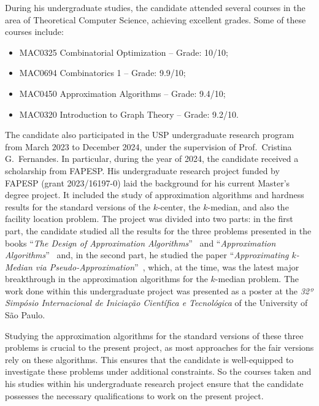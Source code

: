 \documentclass[12pt]{article}
\begin{document}
During his undergraduate studies, the candidate attended several courses in the area of Theoretical Computer Science, achieving excellent grades. Some of these courses include:
\begin{itemize} 
    \item MAC0325 Combinatorial Optimization – Grade: 10/10; 
    \item MAC0694 Combinatorics 1 – Grade: 9.9/10; 
    \item MAC0450 Approximation Algorithms – Grade: 9.4/10; 
    \item MAC0320 Introduction to Graph Theory – Grade: 9.2/10. 
\end{itemize}

The candidate also participated in the USP undergraduate research program from March 2023 to December 2024, under the supervision of Prof.\ Cristina G.\ Fernandes.  In particular, during the year of 2024, the candidate received a scholarship from FAPESP.
His undergraduate research project funded by FAPESP (grant 2023/16197-0) laid the background for his current Master's degree project. 
It included the study of approximation algorithms and hardness results for the standard versions of the $k$-center, 
the $k$-median, and also the facility location problem. 
The project was divided into two parts: in the first part, the candidate studied all the results for the three problems 
presented in the books  ``\emph{The Design of Approximation Algorithms}''~\cite{books/WS} and 
``\emph{Approximation Algorithms}''~\cite{books/Vazirani} and, in the second part, he studied the paper 
``\emph{Approximating $k$-Median via Pseudo-Approximation}''~\cite{LS2012}, which, at the time, 
was the latest major breakthrough in the approximation algorithms for the $k$-median problem. 
The work done within this undergraduate project was presented as a poster at the \emph{32º Simpósio Internacional de Iniciação Científica e Tecnológica} of the University of São Paulo.

Studying the approximation algorithms for the standard versions of these three problems is crucial to the present project, as most approaches for the fair versions rely on these algorithms. This ensures that the candidate is well-equipped to investigate these problems under additional constraints. So the courses taken and his studies within his undergraduate research project ensure that the candidate possesses the necessary qualifications to work on the present project.  
\end{document}
